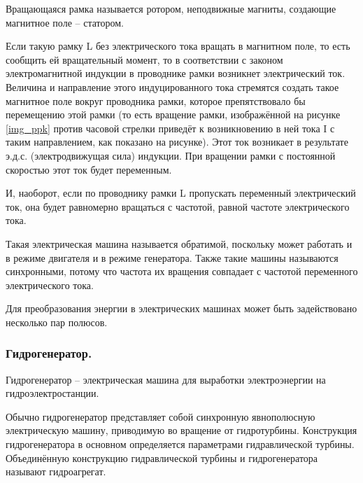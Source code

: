 Вращающаяся рамка называется ротором, неподвижные магниты, создающие магнитное поле -- статором.

Если такую рамку L без электрического тока вращать в магнитном поле, то есть сообщить ей вращательный момент, то в соответствии с законом электромагнитной индукции в проводнике рамки возникнет электрический ток. Величина и направление этого индуцированного тока стремятся создать такое магнитное поле вокруг проводника рамки, которое препятствовало бы перемещению этой рамки (то есть вращение рамки, изображённой на рисунке \ref{img_ppk} против часовой стрелки приведёт к возникновению в ней тока I с таким направлением, как показано на рисунке). Этот ток возникает в результате э.д.с. (электродвижущая сила) индукции. При вращении рамки с постоянной скоростью этот ток будет переменным. 

И, наоборот, если по проводнику рамки L пропускать переменный электрический ток, она будет равномерно вращаться с частотой, равной частоте электрического тока.

Такая электрическая машина называется обратимой, поскольку может работать и в режиме двигателя и в режиме генератора. Также такие машины называются синхронными, потому что частота их вращения совпадает с частотой переменного электрического тока.

Для преобразования энергии в электрических машинах может быть задействовано несколько пар полюсов.



\subsubsection{Гидрогенератор.}

 \begin{opred}
   Гидрогенератор -- электрическая машина для выработки электроэнергии на гидроэлектростанции. 
 \end{opred}

 Обычно гидрогенератор представляет собой синхронную явнополюсную электрическую машину, приводимую во вращение от гидротурбины. Конструкция гидрогенератора в основном определяется параметрами гидравлической турбины. Объединённую конструкцию гидравлической турбины и гидрогенератора называют  гидроагрегат.

